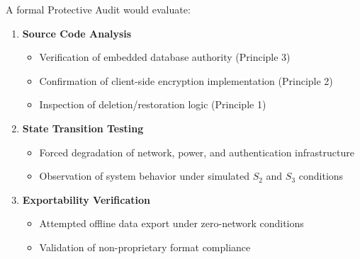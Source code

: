 \documentclass[acmsmall,review]{acmart}
\begin{document}
A formal Protective Audit would evaluate:

\begin{enumerate}
    \item \textbf{Source Code Analysis}
    \begin{itemize}
        \item Verification of embedded database authority (Principle 3)
        \item Confirmation of client-side encryption implementation (Principle 2)
        \item Inspection of deletion/restoration logic (Principle 1)
    \end{itemize}
    \item \textbf{State Transition Testing}
    \begin{itemize}
        \item Forced degradation of network, power, and authentication infrastructure
        \item Observation of system behavior under simulated $S_2$ and $S_3$ conditions
    \end{itemize}
    \item \textbf{Exportability Verification}
    \begin{itemize}
        \item Attempted offline data export under zero-network conditions
        \item Validation of non-proprietary format compliance
    \end{itemize}
\end{enumerate}
\end{document}
